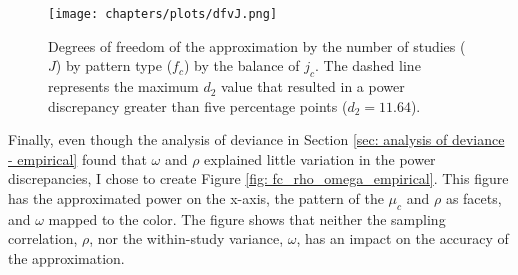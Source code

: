 \begin{figure}
    \centering
    \vspace{-5pt}
    \texttt{[image: chapters/plots/dfvJ.png]}
    \caption{Degrees of freedom of the approximation by the number of studies ($J$) by pattern type ($f_c$) by the balance of $j_c$. The dashed line represents the maximum $d_2$ value that resulted in a power discrepancy greater than five percentage points ($d_2 = 11.64$). \label{fig:dfvJ}}
    \vspace{-5pt}
\end{figure}




Finally, even though the analysis of deviance in Section \ref{sec: analysis of deviance - empirical} found that $\omega$ and $\rho$ explained little variation in the power discrepancies, I chose to create Figure \ref{fig: fc_rho_omega_empirical}. This figure has the approximated power on the x-axis, the pattern of the $\mu_c$ and $\rho$ as facets, and $\omega$ mapped to the color. The figure shows that neither the sampling correlation, $\rho$, nor the within-study variance, $\omega$, has an impact on the accuracy of the approximation.

